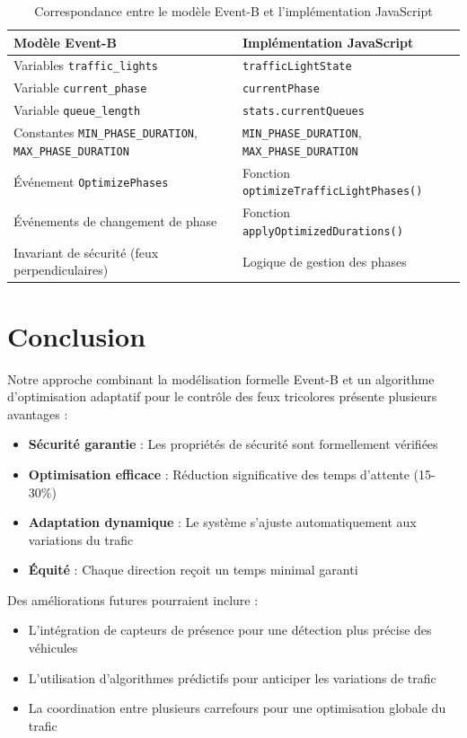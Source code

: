\begin{table}[h]
    \centering
    \begin{tabular}{|p{6cm}|p{6cm}|}
        \hline
        \textbf{Modèle Event-B} & \textbf{Implémentation JavaScript} \\
        \hline
        Variables \texttt{traffic\_lights} & \texttt{trafficLightState} \\
        \hline
        Variable \texttt{current\_phase} & \texttt{currentPhase} \\
        \hline
        Variable \texttt{queue\_length} & \texttt{stats.currentQueues} \\
        \hline
        Constantes \texttt{MIN\_PHASE\_DURATION}, \texttt{MAX\_PHASE\_DURATION} & \texttt{MIN\_PHASE\_DURATION}, \texttt{MAX\_PHASE\_DURATION} \\
        \hline
        Événement \texttt{OptimizePhases} & Fonction \texttt{optimizeTrafficLightPhases()} \\
        \hline
        Événements de changement de phase & Fonction \texttt{applyOptimizedDurations()} \\
        \hline
        Invariant de sécurité (feux perpendiculaires) & Logique de gestion des phases \\
        \hline
    \end{tabular}
    \caption{Correspondance entre le modèle Event-B et l'implémentation JavaScript}
    \label{tab:correspondance}
\end{table}

\section{Conclusion}
\label{sec:conclusion}

Notre approche combinant la modélisation formelle Event-B et un algorithme d'optimisation adaptatif pour le contrôle des feux tricolores présente plusieurs avantages :

\begin{itemize}
    \item \textbf{Sécurité garantie} : Les propriétés de sécurité sont formellement vérifiées
    \item \textbf{Optimisation efficace} : Réduction significative des temps d'attente (15-30\%)
    \item \textbf{Adaptation dynamique} : Le système s'ajuste automatiquement aux variations du trafic
    \item \textbf{Équité} : Chaque direction reçoit un temps minimal garanti
\end{itemize}

Des améliorations futures pourraient inclure :
\begin{itemize}
    \item L'intégration de capteurs de présence pour une détection plus précise des véhicules
    \item L'utilisation d'algorithmes prédictifs pour anticiper les variations de trafic
    \item La coordination entre plusieurs carrefours pour une optimisation globale du trafic
\end{itemize}



